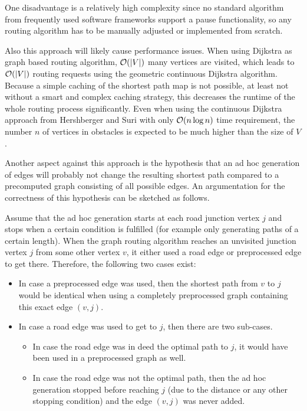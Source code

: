 		One disadvantage is a relatively high complexity since no standard algorithm from frequently used software frameworks support a pause functionality, so any routing algorithm has to be manually adjusted or implemented from scratch.
		
		Also this approach will likely cause performance issues.
		When using Dijkstra as graph based routing algorithm, $\mathcal{O}(|V|)$ many vertices are visited, which leads to $\mathcal{O}(|V|)$ routing requests using the geometric continuous Dijkstra algorithm.
		Because a simple caching of the shortest path map is not possible, at least not without a smart and complex caching strategy, this decreases the runtime of the whole routing process significantly.
		Even when using the continuous Dijkstra approach from Hershberger and Suri \cite{hershberger-suri} with only $\mathcal{O}(n \log n)$ time requirement, the number $n$ of vertices in obstacles is expected to be much higher than the size of $V$.
		
		Another aspect against this approach is the hypothesis that an ad hoc generation of edges will probably not change the resulting shortest path compared to a precomputed graph consisting of all possible edges.
		An argumentation for the correctness of this hypothesis can be sketched as follows.
		
		Assume that the ad hoc generation starts at each road junction vertex $j$ and stops when a certain condition is fulfilled (for example only generating paths of a certain length).
		When the graph routing algorithm reaches an unvisited junction vertex $j$ from some other vertex $v$, it either used a road edge or preprocessed edge to get there. Therefore, the following two cases exist:
		
		\begin{itemize}
			\item In case a preprocessed edge was used, then the shortest path from $v$ to $j$ would be identical when using a completely preprocessed graph containing this exact edge $(v, j)$.
			\item In case a road edge was used to get to $j$, then there are two sub-cases.
			\begin{itemize}
				\item In case the road edge was in deed the optimal path to $j$, it would have been used in a preprocessed graph as well.
				\item In case the road edge was not the optimal path, then the ad hoc generation stopped before reaching $j$ (due to the distance or any other stopping condition) and the edge $(v, j)$ was never added.
			\end{itemize}
		\end{itemize}
		
